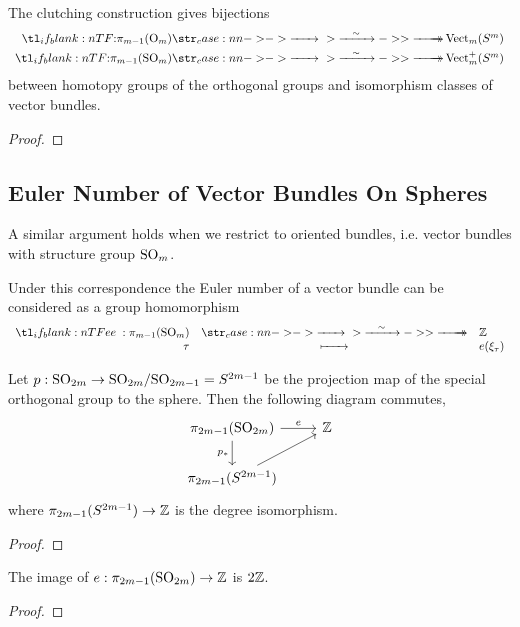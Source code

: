 \begin{theorem}
	The clutching construction gives bijections
	\[
		\begin{aligned}
			\lkxfunc{}{\pi_{m-1}(\O_m)}{\Vect_m(S^m)} \\
			\lkxfunc{}{\pi_{m-1}(\SO_m)}{\Vect_m^+(S^m)}
		\end{aligned}
	\]
	between homotopy groups of the orthogonal groups and isomorphism classes of vector bundles.
\end{theorem}
\begin{proof}
\end{proof}

\subsection{Euler Number of Vector Bundles On Spheres}

A similar argument holds when we restrict to oriented bundles, i.e. vector bundles with structure group $\mathrm{SO}_m$.

Under this correspondence the Euler number of a vector bundle can be considered as a group homomorphism
\[
	\lkxfunc{e}{\pi_{m-1}(\SO_m)}{\Z}{\tau}{e(\xi_\tau)}
\]
\begin{theorem}\label{thm:euler-number-of-vector-bundle-over-sphere}
	Let $p : \mathrm{SO}_{2m} \to \mathrm{SO}_{2m}/\mathrm{SO}_{2m-1}= S^{2m-1}$ be the projection map of the special orthogonal group to the sphere. Then the following diagram commutes,
	\[\begin{tikzcd}
			{\pi_{2m-1}(\SO_{2m})} & \Z \\
			{\pi_{2m-1}(S^{2m-1})}
			\arrow["e", from=1-1, to=1-2]
			\arrow["{p_*}"', from=1-1, to=2-1]
			\arrow[from=2-1, to=1-2]
		\end{tikzcd}\]
	where $\pi_{2m-1}(S^{2m-1})\to \mathbb{Z}$ is the degree isomorphism.
\end{theorem}
\begin{proof}
\end{proof}

\begin{corollary}\label{cor:expressible-euler-numbers-spheres}
	The image of $e : \pi_{2m-1}(\mathrm{SO}_{2m})\to\mathbb{Z}$ is $2\mathbb{Z}$.
\end{corollary}
\begin{proof}
\end{proof}

